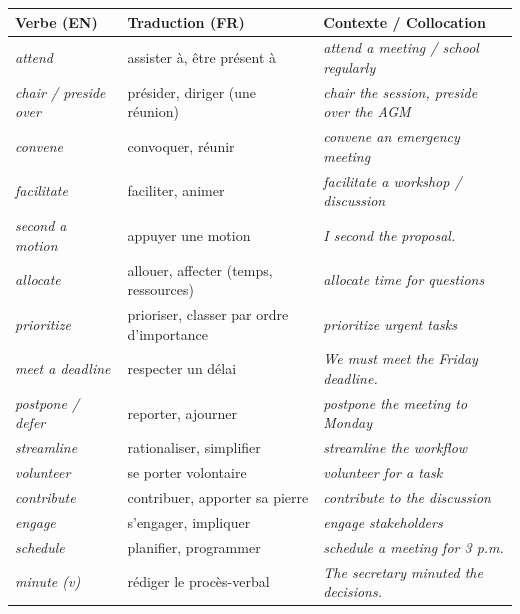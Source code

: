 \documentclass[11pt]{article}
\newcommand{\eng}[1]{\ifmmode\text{\textit{#1}}\else\begingroup\selectlanguage{english}\itshape #1\endgroup\fi}
\begin{document}
\begin{definition}
\begin{center}
\begin{tabularx}{\linewidth}{|X|X|X|}\hline
\rowcolor{popblueL} \textbf{Verbe (EN)} & \textbf{Traduction (FR)} & \textbf{Contexte / Collocation} \\ \hline
\eng{attend} & assister à, être présent à & \eng{attend a meeting / school regularly} \\ \hline
\eng{chair} / \eng{preside over} & présider, diriger (une réunion) & \eng{chair the session, preside over the AGM} \\ \hline
\eng{convene} & convoquer, réunir & \eng{convene an emergency meeting} \\ \hline
\eng{facilitate} & faciliter, animer & \eng{facilitate a workshop / discussion} \\ \hline
\eng{second a motion} & appuyer une motion & \eng{I second the proposal.} \\ \hline
\eng{allocate} & allouer, affecter (temps, ressources) & \eng{allocate time for questions} \\ \hline
\eng{prioritize} & prioriser, classer par ordre d'importance & \eng{prioritize urgent tasks} \\ \hline
\eng{meet a deadline} & respecter un délai & \eng{We must meet the Friday deadline.} \\ \hline
\eng{postpone} / \eng{defer} & reporter, ajourner & \eng{postpone the meeting to Monday} \\ \hline
\eng{streamline} & rationaliser, simplifier & \eng{streamline the workflow} \\ \hline
\eng{volunteer} & se porter volontaire & \eng{volunteer for a task} \\ \hline
\eng{contribute} & contribuer, apporter sa pierre & \eng{contribute to the discussion} \\ \hline
\eng{engage} & s'engager, impliquer & \eng{engage stakeholders} \\ \hline
\eng{schedule} & planifier, programmer & \eng{schedule a meeting for 3 p.m.} \\ \hline
\eng{minute} (v) & rédiger le procès-verbal & \eng{The secretary minuted the decisions.} \\ \hline
\end{tabularx}
\end{center}
\end{definition}
\end{document}
